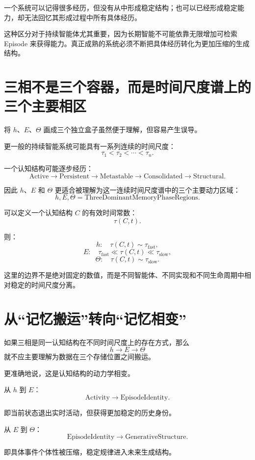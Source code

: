 一个系统可以记得很多经历，但没有从中形成稳定结构；也可以已经形成稳定能力，却无法回忆其形成过程中所有具体经历。

这种区分对于持续智能体尤其重要，因为长期智能不可能依靠无限增加可检索 Episode 来获得能力。真正成熟的系统必须不断把具体经历转化为更加压缩的生成结构。

\section{三相不是三个容器，而是时间尺度谱上的三个主要相区}

将 $h$、$E$、$\Theta$ 画成三个独立盒子虽然便于理解，但容易产生误导。

更一般的持续智能系统可能具有一系列连续的时间尺度：
\[
\tau_1<\tau_2<\cdots<\tau_n.
\]

一个认知结构可能逐步经历：
\[
\text{Active}
\rightarrow
\text{Persistent}
\rightarrow
\text{Metastable}
\rightarrow
\text{Consolidated}
\rightarrow
\text{Structural}.
\]

因此 $h$、$E$ 和 $\Theta$ 更适合被理解为这一连续时间尺度谱中的三个主要动力区域：
\[
\boxed{
h,E,\Theta
=
\text{ThreeDominantMemoryPhaseRegions}.
}
\]

可以定义一个认知结构 $C$ 的有效时间常数：
\[
\tau(C,t).
\]

则：
\[
h:
\quad
\tau(C,t)\sim\tau_{\mathrm{fast}},
\]
\[
E:
\quad
\tau_{\mathrm{fast}}
\ll
\tau(C,t)
\ll
\tau_{\mathrm{slow}},
\]
\[
\Theta:
\quad
\tau(C,t)\sim\tau_{\mathrm{slow}}.
\]

这里的边界不是绝对固定的数值，而是不同智能体、不同实现和不同生命周期中相对稳定的时间尺度分离。

\section{从“记忆搬运”转向“记忆相变”}

如果三相是同一认知结构在不同时间尺度上的存在方式，那么
\[
h\rightarrow E\rightarrow\Theta
\]
就不应主要理解为数据在三个存储位置之间搬运。

更准确地说，这是认知结构的动力学相变。

从 $h$ 到 $E$：
\[
\boxed{
\text{Activity}
\rightarrow
\text{EpisodeIdentity}.
}
\]

即当前状态退出实时活动，但获得更加稳定的历史身份。

从 $E$ 到 $\Theta$：
\[
\boxed{
\text{EpisodeIdentity}
\rightarrow
\text{GenerativeStructure}.
}
\]

即具体事件个体性被压缩，稳定规律进入未来生成结构。

